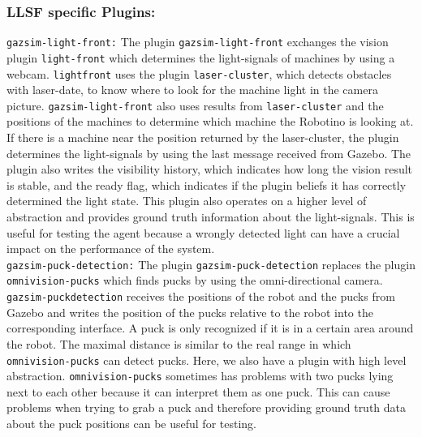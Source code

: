 \subsubsection{LLSF specific Plugins:}

\texttt{gazsim-light-front:}
The plugin \texttt{gazsim-light-front} exchanges the vision plugin \texttt{light-front} which determines the light-signals of machines by using a webcam. \texttt{light\-front} uses the plugin \texttt{laser-cluster}, which detects obstacles with laser-date, to know where to look for the machine light in the camera picture. \texttt{gazsim-light-front} also uses results from \texttt{laser-cluster} and the positions of the machines to determine which machine the Robotino is looking at. If there is a machine near the position returned by the laser-cluster, the plugin determines the light-signals by using the last message received from Gazebo. The plugin also writes the visibility history, which indicates how long the vision result is stable, and the ready flag, which indicates if the plugin beliefs it has correctly determined the light state. This plugin also operates on a higher level of abstraction and provides ground truth information about the light-signals. This is useful for testing the agent because a wrongly detected light can have a crucial impact on the performance of the system.
\\

\texttt{gazsim-puck-detection:}
The plugin \texttt{gazsim-puck-detection} replaces the plugin \texttt{omnivision-pucks} which finds pucks by using the omni-directional camera. \texttt{gazsim-puck\-detection} receives the positions of the robot and the pucks from Gazebo and writes the position of the pucks relative to the robot into the corresponding interface. A puck is only recognized if it is in a certain area around the robot. The maximal distance is similar to the real range in which \texttt{omnivision-pucks} can detect pucks. Here, we also have a plugin with high level abstraction. \texttt{omnivision-pucks} sometimes has problems with two pucks lying next to each other because it can interpret them as one puck. This can cause problems when trying to grab a puck and therefore providing ground truth data about the puck positions can be useful for testing.
\\

